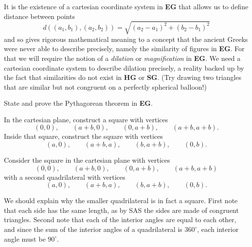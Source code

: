 \documentclass{ximera}
\begin{document}
It is the existence of a cartesian coordinate system in \textbf{EG} that
allows us to define distance between points%
\[
d\left( (a_{1},b_{1}), (a_{2},b_{2}) \right)
=\sqrt{(a_{2}-a_{1})^{2}+(b_{2}-b_{1})^{2}}
\]
and so gives rigorous mathematical meaning to a concept that the
ancient Greeks were never able to describe precisely, namely the
similarity of figures in \textbf{EG}. For that we will require the
notion of a \textit{dilation} or \textit{magnification} in
\textbf{EG}. We need a cartesian coordinate system to describe
dilation precisely, a reality backed up by the fact that similarities
do not exist in \textbf{HG} or \textbf{SG}. (Try drawing two triangles
that are similar but not congruent on a perfectly spherical balloon!)

\begin{problem}
State and prove the Pythagorean theorem in \textbf{EG}.

\begin{hint}
In the cartesian plane, construct a square with vertices
\[
\left(0,0\right),\qquad \left(a+b,0\right),\qquad \left(0,a+b\right), \qquad \left( a+b,a+b\right).
\] 
Inside that square, construct the square with vertices 
\[
\left(a,0\right),\qquad \left(a+b,a\right),\qquad \left(b,a+b\right), \qquad \left(0,b\right).
\]
\end{hint}
\begin{freeResponse}
Consider the square in the cartesian plane with vertices
\[
\left(0,0\right),\qquad \left(a+b,0\right),\qquad \left(0,a+b\right),
\qquad \left( a+b,a+b\right)
\]
with a second quadrilateral with vertices
\[
\left(a,0\right),\qquad \left(a+b,a\right),\qquad \left(b,a+b\right), \qquad \left(0,b\right).
\]
\begin{image}
\end{image}
We should explain why the smaller quadrilateral is in fact a
square. First note that each side has the same length, as by SAS the
sides are made of congruent triangles. Second note that each of the
interior angles are equal to each other, and since the sum of the
interior angles of a quadrilateral is $360^\circ$, each interior angle
must be $90^\circ$.


\end{freeResponse}
\end{problem}
\end{document}
